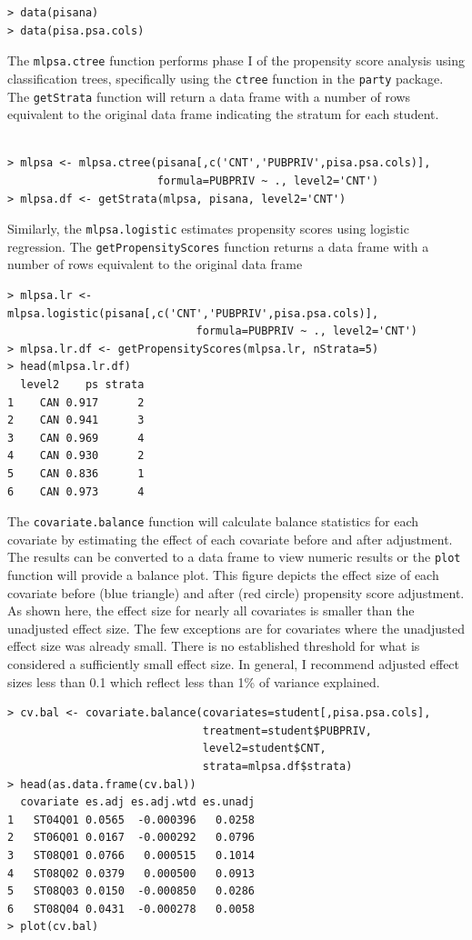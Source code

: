 \documentclass[letterpaper,12p,twoside]{article} %
\begin{document}
\begin{verbatim}
> data(pisana)
> data(pisa.psa.cols)
\end{verbatim}

The \texttt{mlpsa.ctree} function performs phase I of the propensity score analysis using classification trees, specifically using the \texttt{ctree} function in the \texttt{party} package. The \texttt{getStrata} function will return a data frame with a number of rows equivalent to the original data frame indicating the stratum for each student.

\begin{verbatim}

> mlpsa <- mlpsa.ctree(pisana[,c('CNT','PUBPRIV',pisa.psa.cols)], 
                       formula=PUBPRIV ~ ., level2='CNT')
> mlpsa.df <- getStrata(mlpsa, pisana, level2='CNT')
\end{verbatim}

Similarly, the \texttt{mlpsa.logistic} estimates propensity scores using logistic regression. The \texttt{getPropensityScores} function returns a data frame with a number of rows equivalent to the original data frame 

\begin{verbatim}
> mlpsa.lr <- mlpsa.logistic(pisana[,c('CNT','PUBPRIV',pisa.psa.cols)],
                             formula=PUBPRIV ~ ., level2='CNT')
> mlpsa.lr.df <- getPropensityScores(mlpsa.lr, nStrata=5)
> head(mlpsa.lr.df)
  level2    ps strata
1    CAN 0.917      2
2    CAN 0.941      3
3    CAN 0.969      4
4    CAN 0.930      2
5    CAN 0.836      1
6    CAN 0.973      4
\end{verbatim}

The \texttt{covariate.balance} function will calculate balance statistics for each covariate by estimating the effect of each covariate before and after adjustment. The results can be converted to a data frame to view numeric results or the \texttt{plot} function will provide a balance plot. This figure depicts the effect size of each covariate before (blue triangle) and after (red circle) propensity score adjustment. As shown here, the effect size for nearly all covariates is smaller than the unadjusted effect size. The few exceptions are for covariates where the unadjusted effect size was already small. There is no established threshold for what is considered a sufficiently small effect size. In general, I recommend adjusted effect sizes less than 0.1 which reflect less than 1\% of variance explained.

\begin{verbatim}
> cv.bal <- covariate.balance(covariates=student[,pisa.psa.cols],
                              treatment=student$PUBPRIV,
                              level2=student$CNT,
                              strata=mlpsa.df$strata)
> head(as.data.frame(cv.bal))
  covariate es.adj es.adj.wtd es.unadj
1   ST04Q01 0.0565  -0.000396   0.0258
2   ST06Q01 0.0167  -0.000292   0.0796
3   ST08Q01 0.0766   0.000515   0.1014
4   ST08Q02 0.0379   0.000500   0.0913
5   ST08Q03 0.0150  -0.000850   0.0286
6   ST08Q04 0.0431  -0.000278   0.0058
> plot(cv.bal)
\end{verbatim}
\end{document}
